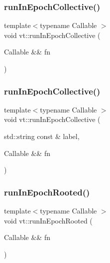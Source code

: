 \subsubsection{\texorpdfstring{run\+In\+Epoch\+Collective()}{runInEpochCollective()}\hspace{0.1cm}{\footnotesize\ttfamily [1/2]}}
{\footnotesize\ttfamily template$<$typename Callable $>$ \\
void vt\+::run\+In\+Epoch\+Collective (\begin{DoxyParamCaption}\item[{Callable \&\&}]{fn }\end{DoxyParamCaption})}

\mbox{\label{namespacevt_aa6f98f3a207d6d329cf36cbd6d523626}} 
\subsubsection{\texorpdfstring{run\+In\+Epoch\+Collective()}{runInEpochCollective()}\hspace{0.1cm}{\footnotesize\ttfamily [2/2]}}
{\footnotesize\ttfamily template$<$typename Callable $>$ \\
void vt\+::run\+In\+Epoch\+Collective (\begin{DoxyParamCaption}\item[{std\+::string const \&}]{label,  }\item[{Callable \&\&}]{fn }\end{DoxyParamCaption})}

\mbox{\label{namespacevt_a9f5cbbc484d7f14f2ad0ee46d62dfb6e}} 
\subsubsection{\texorpdfstring{run\+In\+Epoch\+Rooted()}{runInEpochRooted()}\hspace{0.1cm}{\footnotesize\ttfamily [1/2]}}
{\footnotesize\ttfamily template$<$typename Callable $>$ \\
void vt\+::run\+In\+Epoch\+Rooted (\begin{DoxyParamCaption}\item[{Callable \&\&}]{fn }\end{DoxyParamCaption})}

